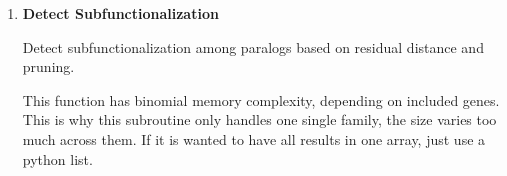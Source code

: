 \begin{enumerate}
        \textbf{Arguments:}
        \begin{itemize}
            \item \lstinline!ancestor (array-like)!: vector of shape \lstinline!(n_dims)!.
            \item \lstinline!genes (array-like)!: 2D array of shape \lstinline!(n_dims, n_genes)! containing all genes.
            \item \lstinline!filtered_paralogs_mask (array-like)!: int32 mask (chunks of 32 bits) for \lstinline!n_genes!.
            \item \lstinline!max_subset_size (int)!: desired maximum subset size (may be adjusted).
            \item \lstinline!gain_gamma (float)!: required magnitude gain (default \lstinline!0.1!).
            \item \lstinline!max_angle (float)!: maximum allowed angle in radians (default \(\pi\)).
        \end{itemize}

        \textbf{Returns:}
        \begin{itemize}
            \item \lstinline!dict!: \{ \lstinline!'n_results': int!, \lstinline!'results': np.ndarray! \}
        \end{itemize}

\begin{lstlisting}[language=Python, caption={Dosage Effect Detection}]
n_results, results = tox_detect_dosage_effect(
    ancestor, genes, filtered_paralogs_mask, max_subset_size,
    gain_gamma=0.1, max_angle=np.pi
).values()
\end{lstlisting}


    \item \textbf{Detect Subfunctionalization}

        Detect subfunctionalization among paralogs based on residual distance and pruning.

        This function has binomial memory complexity, depending on included genes. This is why this subroutine only handles one single family, the size varies too much across them. If it is wanted to have all results in one array, just use a python list.


\end{enumerate}
